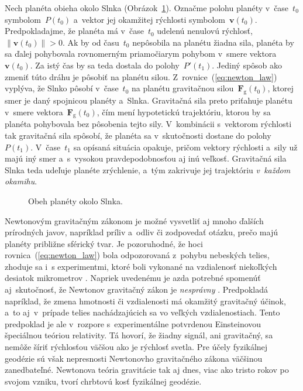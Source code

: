 \documentclass[a4paper, 12pt]{book}
\newcommand{\gidx}{\mathrm g}
\let\vec\mathbf
\begin{document}
Nech planéta obieha okolo Slnka (Obrázok~\ref{fig:orbital_motion}).  Označme 
polohu planéty v~čase~$t_0$ symbolom~$P(t_0)$ a~vektor jej okamžitej rýchlosti 
symbolom~$\vec v(t_0)$.  Predpokladajme, že planéta má v~čase~$t_0$ udelenú 
nenulovú rýchlosť, $\| \vec v(t_0) \| > 0$.  Ak by od času~$t_0$ nepôsobila na 
planétu žiadna sila, planéta by sa ďalej pohybovala rovnomerným priamočiarym 
pohybom v~smere vektora~$\vec v(t_0)$.  Za istý čas by sa teda dostala do 
polohy~$P'(t_1)$.  Jediný spôsob ako zmeniť túto dráhu je pôsobiť na planétu 
silou.  Z~rovnice~(\ref{eq:newton_law}) vyplýva, že Slnko pôsobí v~čase~$t_0$ 
na planétu gravitačnou silou~$\vec F_\gidx(t_0)$, ktorej smer je daný spojnicou 
planéty a~Slnka.  Gravitačná sila preto priťahuje planétu v~smere vektora~$\vec 
F_\gidx(t_0)$, čím mení hypotetickú trajektóriu, ktorou by sa planéta 
pohybovala bez pôsobenia tejto sily.  V~kombinácii s~vektorom rýchlosti tak 
gravitačná sila spôsobí, že planéta sa v~skutočnosti dostane do 
polohy~$P(t_1)$.  V~čase~$t_1$ sa opísaná situácia opakuje, pričom vektory 
rýchlosti a~sily už majú iný smer a~s~vysokou pravdepodobnosťou aj inú veľkosť.  
Gravitačná sila Slnka teda udeľuje planéte zrýchlenie, a~tým zakrivuje jej 
trajektóriu \emph{v~každom okamihu}.

\begin{figure}
\centering

\caption{Obeh planéty okolo Slnka.}
\label{fig:orbital_motion}
\end{figure}

Newtonovým gravitačným zákonom je možné vysvetliť aj mnoho ďalších prírodných 
javov, napríklad príliv a~odliv či zodpovedať otázku, prečo majú planéty 
približne sférický tvar.  Je pozoruhodné, že hoci rovnica~(\ref{eq:newton_law}) 
bola odpozorovaná z~pohybu nebeských telies, zhoduje sa i~s experimentmi, ktoré 
boli vykonané na vzdialenosť niekoľkých desiatok mikrometrov 
\parencite{Lee2020}.  Napriek uvedenému je azda potrebné spomenúť 
aj~skutočnosť, že Newtonov gravitačný zákon je \emph{nesprávny} 
\parencite{Feynman}.  Predpokladá napríklad, že zmena hmotnosti či vzdialenosti 
má okamžitý gravitačný účinok, a~to aj~v~prípade telies nachádzajúcich sa vo 
veľkých vzdialenostiach.  Tento predpoklad je ale v~rozpore s~experimentálne 
potvrdenou Einsteinovou špeciálnou teóriou relativity.  Tá hovorí, že žiadny 
signál, ani gravitačný, sa nemôže šíriť rýchlosťou väčšou ako je rýchlosť 
svetla.  Pre účely fyzikálnej geodézie sú však nepresnosti Newtonovho 
gravitačného zákona väčšinou zanedbateľné.  Newtonova teória gravitácie tak aj 
dnes, viac ako tristo rokov po svojom vzniku, tvorí chrbtovú kosť fyzikálnej 
geodézie.
\end{document}
